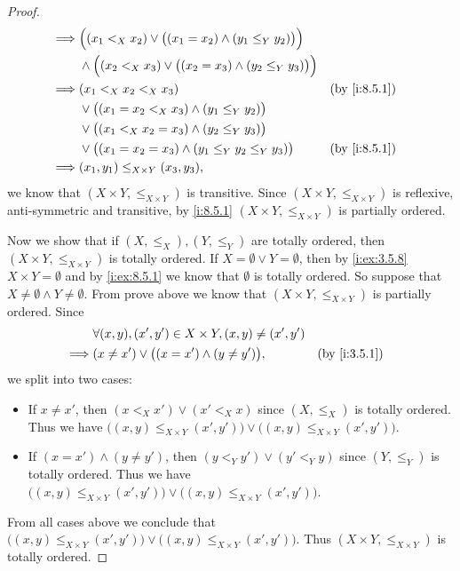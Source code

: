 \begin{proof}
\begin{align*}
    \implies & \Big((x_1 <_X x_2) \lor \big((x_1 = x_2) \land (y_1 \leq_Y y_2)\big)\Big)                                                   \\
             & \land \Big((x_2 <_X x_3) \lor \big((x_2 = x_3) \land (y_2 \leq_Y y_3)\big)\Big)                                             \\
    \implies & (x_1 <_X x_2 <_X x_3)                                                                                     &  & \by{i:8.5.1} \\
             & \lor \big((x_1 = x_2 <_X x_3) \land (y_1 \leq_Y y_2)\big)                                                                   \\
             & \lor \big((x_1 <_X x_2 = x_3) \land (y_2 \leq_Y y_3)\big)                                                                   \\
             & \lor \big((x_1 = x_2 = x_3) \land (y_1 \leq_Y y_2 \leq_Y y_3)\big)                                        &  & \by{i:8.5.1} \\
    \implies & (x_1, y_1) \leq_{X \times Y} (x_3, y_3),
  \end{align*}
  we know that \((X \times Y, \leq_{X \times Y})\) is transitive.
  Since \((X \times Y, \leq_{X \times Y})\) is reflexive, anti-symmetric and transitive, by \cref{i:8.5.1} \((X \times Y, \leq_{X \times Y})\) is partially ordered.

  Now we show that if \((X, \leq_X), (Y, \leq_Y)\) are totally ordered, then \((X \times Y, \leq_{X \times Y})\) is totally ordered.
  If \(X = \emptyset \lor Y = \emptyset\), then by \cref{i:ex:3.5.8} \(X \times Y = \emptyset\) and by \cref{i:ex:8.5.1} we know that \(\emptyset\) is totally ordered.
  So suppose that \(X \neq \emptyset \land Y \neq \emptyset\).
  From prove above we know that \((X \times Y, \leq_{X \times Y})\) is partially ordered.
  Since
  \begin{align*}
             & \forall (x, y), (x', y') \in X \times Y, (x, y) \neq (x', y')                   \\
    \implies & (x \neq x') \lor \big((x = x') \land (y \neq y')\big),        &  & \by{i:3.5.1}
  \end{align*}
  we split into two cases:
  \begin{itemize}
    \item If \(x \neq x'\), then \((x <_X x') \lor (x' <_X x)\) since \((X, \leq_X)\) is totally ordered.
          Thus we have \(\big((x, y) \leq_{X \times Y} (x', y')\big) \lor \big((x, y) \leq_{X \times Y} (x', y')\big)\).
    \item If \((x = x') \land (y \neq y')\), then \((y <_Y y') \lor (y' <_Y y)\) since \((Y, \leq_Y)\) is totally ordered.
          Thus we have \(\big((x, y) \leq_{X \times Y} (x', y')\big) \lor \big((x, y) \leq_{X \times Y} (x', y')\big)\).
  \end{itemize}
  From all cases above we conclude that \(\big((x, y) \leq_{X \times Y} (x', y')\big) \lor \big((x, y) \leq_{X \times Y} (x', y')\big)\).
  Thus \((X \times Y, \leq_{X \times Y})\) is totally ordered.


\end{proof}
